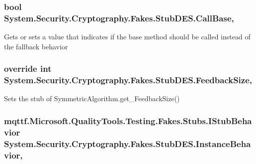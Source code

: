 \hypertarget{class_system_1_1_security_1_1_cryptography_1_1_fakes_1_1_stub_d_e_s_a7e9740e14d1a8d3339daab2d9c2b2981}{
\subsubsection[{Call\-Base}]{\setlength{\rightskip}{0pt plus 5cm}bool System.\-Security.\-Cryptography.\-Fakes.\-Stub\-D\-E\-S.\-Call\-Base\hspace{0.3cm}{\ttfamily [get]}, {\ttfamily [set]}}}\label{class_system_1_1_security_1_1_cryptography_1_1_fakes_1_1_stub_d_e_s_a7e9740e14d1a8d3339daab2d9c2b2981}


Gets or sets a value that indicates if the base method should be called instead of the fallback behavior

\hypertarget{class_system_1_1_security_1_1_cryptography_1_1_fakes_1_1_stub_d_e_s_a31b7cb4535d9be85c9326d0d8f2628a6}{
\subsubsection[{Feedback\-Size}]{\setlength{\rightskip}{0pt plus 5cm}override int System.\-Security.\-Cryptography.\-Fakes.\-Stub\-D\-E\-S.\-Feedback\-Size\hspace{0.3cm}{\ttfamily [get]}, {\ttfamily [set]}}}\label{class_system_1_1_security_1_1_cryptography_1_1_fakes_1_1_stub_d_e_s_a31b7cb4535d9be85c9326d0d8f2628a6}


Sets the stub of Symmetric\-Algorithm.\-get\-\_\-\-Feedback\-Size()

\hypertarget{class_system_1_1_security_1_1_cryptography_1_1_fakes_1_1_stub_d_e_s_a4ba048f71eff764e2a2ce57cd4356524}{
\subsubsection[{Instance\-Behavior}]{\setlength{\rightskip}{0pt plus 5cm}mqttf.\-Microsoft.\-Quality\-Tools.\-Testing.\-Fakes.\-Stubs.\-I\-Stub\-Behavior System.\-Security.\-Cryptography.\-Fakes.\-Stub\-D\-E\-S.\-Instance\-Behavior\hspace{0.3cm}{\ttfamily [get]}, {\ttfamily [set]}}}\label{class_system_1_1_security_1_1_cryptography_1_1_fakes_1_1_stub_d_e_s_a4ba048f71eff764e2a2ce57cd4356524}


